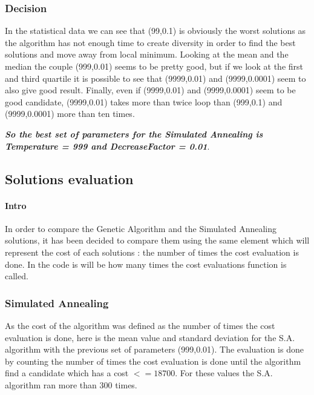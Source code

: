 \documentclass[11pt]{article}
\begin{document}
\hypertarget{decision}{%
\subsubsection{Decision}\label{decision}}

In the statistical data we can see that (99,0.1) is obviously the worst
solutions as the algorithm has not enough time to create diversity in
order to find the best solutions and move away from local minimum.
Looking at the mean and the median the couple (999,0.01) seems to be
pretty good, but if we look at the first and third quartile it is
possible to see that (9999,0.01) and (9999,0.0001) seem to also give
good result. Finally, even if (9999,0.01) and (9999,0.0001) seem to be
good candidate, (9999,0.01) takes more than twice loop than (999,0.1)
and (9999,0.0001) more than ten times.

\textbf{\emph{So the best set of parameters for the Simulated Annealing
is Temperature = 999 and DecreaseFactor = 0.01}}.

\pagebreak

    \hypertarget{solutions-evaluation}{%
\subsection{Solutions evaluation}\label{solutions-evaluation}}

\hypertarget{intro}{%
\paragraph{Intro}\label{intro}}

In order to compare the Genetic Algorithm and the Simulated Annealing
solutions, it has been decided to compare them using the same element
which will represent the cost of each solutions : the number of times the
cost evaluation is done. In the code is will be how many times the cost
evaluations function is called.

\hypertarget{simulated-annealing}{%
\subsubsection{Simulated Annealing}\label{simulated-annealing}}

As the cost of the algorithm was defined as the number of times the cost
evaluation is done, here is the mean value and standard deviation for the
S.A. algorithm with the previous set of parameters (999,0.01). The
evaluation is done by counting the number of times the cost evaluation is
done until the algorithm find a candidate which has a cost \(<= 18 700\).
For these values the S.A. algorithm ran more than 300 times.
\end{document}
